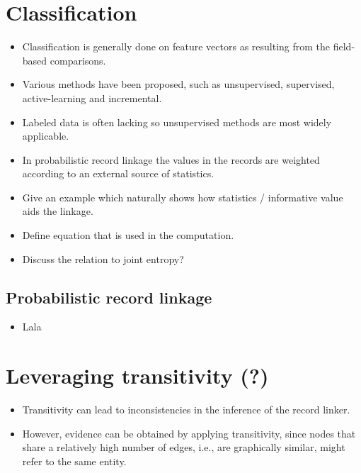 

\section{Classification}
\label{sec:classification}

\begin{itemize}
    \item Classification is generally done on feature vectors as resulting from the field-based comparisons.
    \item Various methods have been proposed, such as unsupervised, supervised, active-learning and incremental.
    \item Labeled data is often lacking so unsupervised methods are most widely applicable.
    \item In probabilistic record linkage the values in the records are weighted according to an external source of statistics.
    \item Give an example which naturally shows how statistics / informative value aids the linkage.
    \item Define equation that is used in the computation.
    \item Discuss the relation to joint entropy?
\end{itemize}




\subsection{Probabilistic record linkage}
\begin{itemize}
    \item Lala
\end{itemize}





\section{Leveraging transitivity (?)}
\begin{itemize}
    \item Transitivity can lead to inconsistencies in the inference of the record linker.
    \item However, evidence can be obtained by applying transitivity, since nodes that share a relatively high number of edges, i.e., are graphically similar, might refer to the same entity.
\end{itemize}


